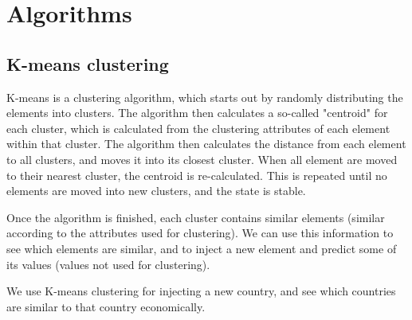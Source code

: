 \chapter{Algorithms}
\label{Algo}

\section{K-means clustering}
K-means is a clustering algorithm, which starts out by randomly distributing the elements into clusters. The algorithm then calculates a so-called "centroid" for each cluster, which is calculated from the clustering attributes of each element within that cluster. The algorithm then calculates the distance from each element to all clusters, and moves it into its closest cluster. When all element are moved to their nearest cluster, the centroid is re-calculated. This is repeated until no elements are moved into new clusters, and the state is stable.

Once the algorithm is finished, each cluster contains similar elements (similar according to the attributes used for clustering). We can use this information to see which elements are similar, and to inject a new element and predict some of its values (values not used for clustering).

We use K-means clustering for injecting a new country, and see which countries are similar to that country economically.